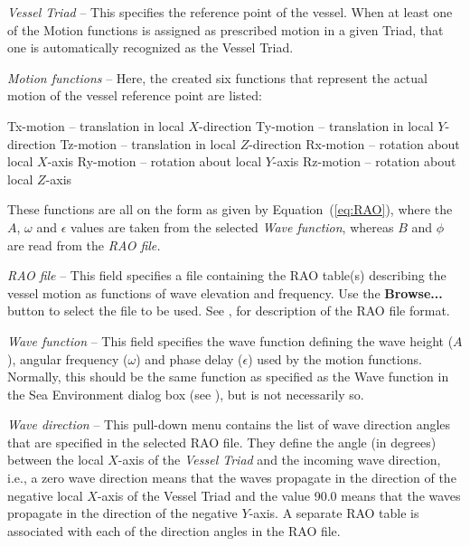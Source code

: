 \begin{bulletlist}
\item{\sl Vessel Triad} --
  This specifies the reference point of the vessel.
  When at least one of the Motion functions is assigned as prescribed motion in
  a given Triad, that one is automatically recognized as the Vessel Triad.

\item{\sl Motion functions} --
  Here, the created six functions that represent the actual motion
  of the vessel reference point are listed:

  \begin{enumerate}
  \subitem Tx-motion -- translation in local $X$-direction
  \subitem Ty-motion -- translation in local $Y$-direction
  \subitem Tz-motion -- translation in local $Z$-direction
  \subitem Rx-motion -- rotation about local $X$-axis
  \subitem Ry-motion -- rotation about local $Y$-axis
  \subitem Rz-motion -- rotation about local $Z$-axis
  \end{enumerate}

  These functions are all on the form as given by Equation~(\ref{eq:RAO}),
  where the $A$, $\omega$ and $\epsilon$ values are taken from the selected
  {\sl Wave function}, whereas $B$ and $\phi$ are read from the {\sl RAO file.}

\item{\sl RAO file} --
  This field specifies a file containing the RAO table(s) describing the
  vessel motion as functions of wave elevation and frequency.
  Use the \textbf{Browse...} button to select the file to be used.
  See ,
  for description of the RAO file format.

\item{\sl Wave function} --
  This field specifies the wave function defining the wave height ($A$),
  angular frequency ($\omega$) and phase delay ($\epsilon$) used by
  the motion functions. Normally, this should be the same function as specified
  as the Wave function in the Sea Environment dialog box (see
  ), but is not necessarily so.

\item{\sl Wave direction} --
  This pull-down menu contains the list of wave direction angles that are
  specified in the selected RAO file. They define the angle (in degrees)
  between the local $X$-axis of the {\sl Vessel Triad} and the incoming
  wave direction, i.e., a zero wave direction means that the waves propagate
  in the direction of the negative local $X$-axis of the Vessel Triad
  and the value 90.0 means that the waves propagate in the direction
  of the negative $Y$-axis. A separate RAO table is associated with
  each of the direction angles in the RAO file.


\end{bulletlist}
